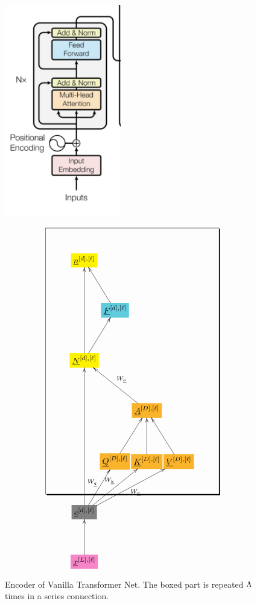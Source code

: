 \documentclass[12pt]{article}
\begin{document}
\begin{figure}[h!]\centering
\begin{minipage}{.4\linewidth}
\includegraphics[width=2in]{encoder.jpg}
\end{minipage}%
\begin{minipage}{.6\linewidth}
$$\xymatrix@R=3.5pc@C=0.1pc{
*+[F*:yellow]{\underline{n}^{[d], [\ell]}}&&&
\\
&*+[F*:SkyBlue]{\underline{F}^{[d], [\ell]}}\ar[ul]&&
\\
*+[F*:yellow]{\underline{N}^{[d], [\ell]}}\ar[ur]\ar[uu]&&&
\\
&&*+[F*:Dandelion]{\underline{A}^{[D], [\ell]}}\ar[ull]_{W_\rva}&
\\
&*+[F*:Dandelion]{\underline{Q}^{[D], [\ell]}}\ar[ur]&*+[F*:Dandelion]{\underline{K}^{[D], [\ell]}}\ar[u]&*+[F*:Dandelion]{\underline{V}^{[D], [\ell]}}\ar[ul]
\\
*+[F*:gray]{\underline{e}^{[d], [\ell]}}\ar[urr]^{W_\rvk}\ar[uuu]\ar[ur]^{W_\rvq}\ar[urrr]_{W_\rvv}&&&
\\
*+[F*:Lavender]{\underline{x}^{[L],[\ell]}}\ar[u]&&&
\save
\POS"1,1"."5,1"."1,4"."5,4"!C*+<6.0em>\frm{-,}
\restore
}$$
\end{minipage}
\caption{Encoder of Vanilla Transformer Net. The boxed part is repeated $\Lambda$ times in a series connection.}
\label{fig-texnn-for-encoder}
\end{figure}
\end{document}
